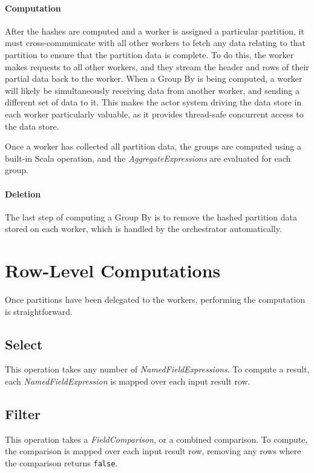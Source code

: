 \paragraph{Computation}
After the hashes are computed and a worker is assigned a particular partition, it must cross-communicate with all other workers to fetch any data relating to that partition to ensure that the partition data is complete. To do this, the worker makes requests to all other workers, and they stream the header and rows of their partial data back to the worker. When a Group By is being computed, a worker will likely be simultaneously receiving data from another worker, and sending a different set of data to it. This makes the actor system driving the data store in each worker particularly valuable, as it provides thread-safe concurrent access to the data store.

Once a worker has collected all partition data, the groups are computed using a built-in Scala operation, and the \textit{AggregateExpressions} are evaluated for each group.

\paragraph{Deletion}
The last step of computing a Group By is to remove the hashed partition data stored on each worker, which is handled by the orchestrator automatically.



\section{Row-Level Computations}
Once partitions have been delegated to the workers, performing the computation is straightforward. 

\subsection{Select}\label{subsec:select-computation}
This operation takes any number of \textit{NamedFieldExpressions}. To compute a result, each \textit{NamedFieldExpression} is mapped over each input result row. 

\subsection{Filter}\label{subsec:filter-computation}
This operation takes a \textit{FieldComparison}, or a combined comparison. To compute, the comparison is mapped over each input result row, removing any rows where the comparison returns \texttt{false}.



